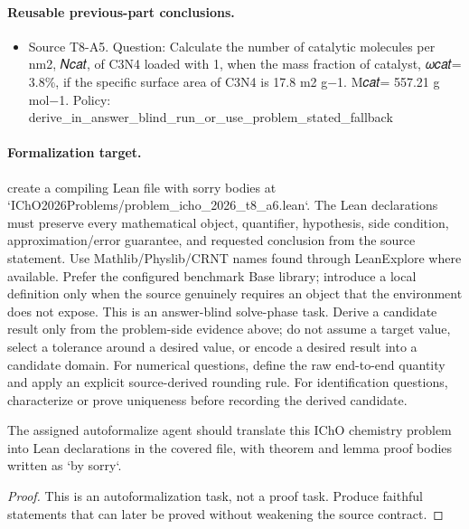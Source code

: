 \paragraph{Reusable previous-part conclusions.}
\begin{itemize}
\item Source T8-A5. Question: Calculate the number of catalytic molecules per nm2, 𝑁𝑐𝑎𝑡, of C3N4 loaded with 1, when the mass fraction of catalyst, 𝜔𝑐𝑎𝑡= 3.8\%, if the specific surface area of C3N4 is 17.8 m2 g−1. M𝑐𝑎𝑡= 557.21 g mol−1. Policy: derive\_in\_answer\_blind\_run\_or\_use\_problem\_stated\_fallback
\end{itemize}

\paragraph{Formalization target.}
create a compiling Lean file with sorry bodies at `IChO2026Problems/problem\_icho\_2026\_t8\_a6.lean`.
The Lean declarations must preserve every mathematical object, quantifier, hypothesis, side condition, approximation/error guarantee, and requested conclusion from the source statement.
Use Mathlib/Physlib/CRNT names found through LeanExplore where available. Prefer the configured benchmark Base library; introduce a local definition only when the source genuinely requires an object that the environment does not expose.
This is an answer-blind solve-phase task. Derive a candidate result only from the problem-side evidence above; do not assume a target value, select a tolerance around a desired value, or encode a desired result into a candidate domain.
For numerical questions, define the raw end-to-end quantity and apply an explicit source-derived rounding rule. For identification questions, characterize or prove uniqueness before recording the derived candidate.

\begin{theorem}
\label{thm:physics:icho_2026_t8_a6:target}
The assigned autoformalize agent should translate this IChO chemistry problem into Lean declarations in the covered file, with theorem and lemma proof bodies written as `by sorry`.
\end{theorem}
\begin{proof}
This is an autoformalization task, not a proof task. Produce faithful statements that can later be proved without weakening the source contract.
\end{proof}
